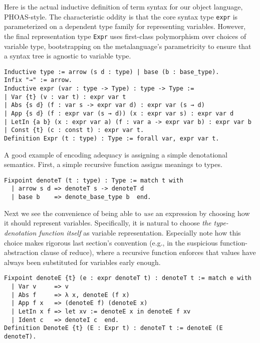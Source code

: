 \documentclass[a4paper,USenglish,cleveref,autoref,thm-restate]{lipics-v2021}
\begin{document}
Here is the actual inductive definition of term syntax for our object language, PHOAS-style.
The characteristic oddity is that the core syntax type \texttt{expr} is parameterized on a dependent type family for representing variables.
However, the final representation type \texttt{Expr} uses first-class polymorphism over choices of variable type, bootstrapping on the metalanguage's parametricity to ensure that a syntax tree is agnostic to variable type.
\begin{verbatim}
Inductive type := arrow (s d : type) | base (b : base_type).
Infix "→" := arrow.
Inductive expr (var : type -> Type) : type -> Type :=
| Var {t} (v : var t) : expr var t
| Abs {s d} (f : var s -> expr var d) : expr var (s → d)
| App {s d} (f : expr var (s → d)) (x : expr var s) : expr var d
| LetIn {a b} (x : expr var a) (f : var a -> expr var b) : expr var b
| Const {t} (c : const t) : expr var t.
Definition Expr (t : type) : Type := forall var, expr var t.
\end{verbatim}

A good example of encoding adequacy is assigning a simple denotational semantics.
First, a simple recursive function assigns meanings to types.
\begin{verbatim}
Fixpoint denoteT (t : type) : Type := match t with
  | arrow s d => denoteT s -> denoteT d
  | base b    => denote_base_type b  end.
\end{verbatim}

Next we see the convenience of being able to \emph{use} an expression by choosing how it should represent variables.
Specifically, it is natural to choose \emph{the type-denotation function itself} as variable representation.
Especially note how this choice makes rigorous last section's convention (e.g., in the suspicious function-abstraction clause of reduce), where a recursive function enforces that values have always been substituted for variables early enough.
\begin{verbatim}
Fixpoint denoteE {t} (e : expr denoteT t) : denoteT t := match e with
  | Var v     => v
  | Abs f     => λ x, denoteE (f x)
  | App f x   => (denoteE f) (denoteE x)
  | LetIn x f => let xv := denoteE x in denoteE f xv
  | Ident c   => denoteI c  end.
Definition DenoteE {t} (E : Expr t) : denoteT t := denoteE (E denoteT).
\end{verbatim}
\end{document}
